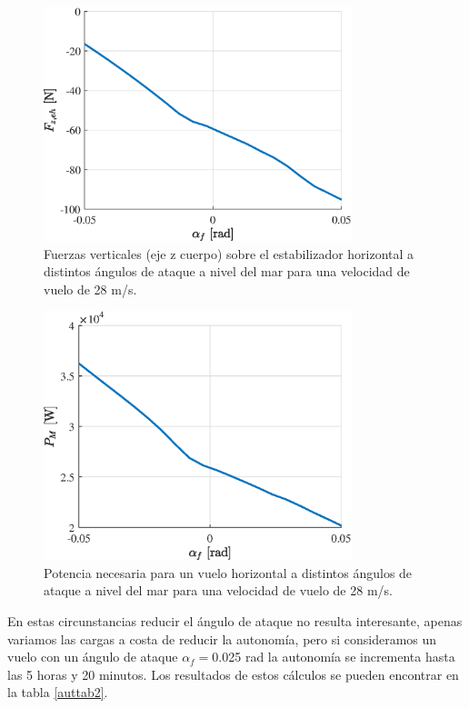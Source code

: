 \begin{figure}
	\centering
	\includegraphics[width=90mm]{graficos/FEHa}
	\caption{Fuerzas verticales (eje z cuerpo) sobre el estabilizador horizontal a distintos ángulos de ataque a nivel del mar para una velocidad de vuelo de 28 m/s.}
	\label{FEa}
\end{figure}

\begin{figure}
	\centering
	\includegraphics[width=90mm]{graficos/PMVHa}
	\caption{Potencia necesaria para un vuelo horizontal a distintos ángulos de ataque a nivel del mar para una velocidad de vuelo de 28 m/s.}
	\label{PMVHa}
\end{figure}

En estas circunstancias reducir el ángulo de ataque no resulta interesante, apenas variamos las cargas a costa de reducir la autonomía, pero si consideramos un vuelo con un ángulo de ataque $\alpha_f=$0.025 rad la autonomía se incrementa hasta las 5 horas y 20 minutos. Los resultados de estos cálculos se pueden encontrar en la tabla \ref{auttab2}.


